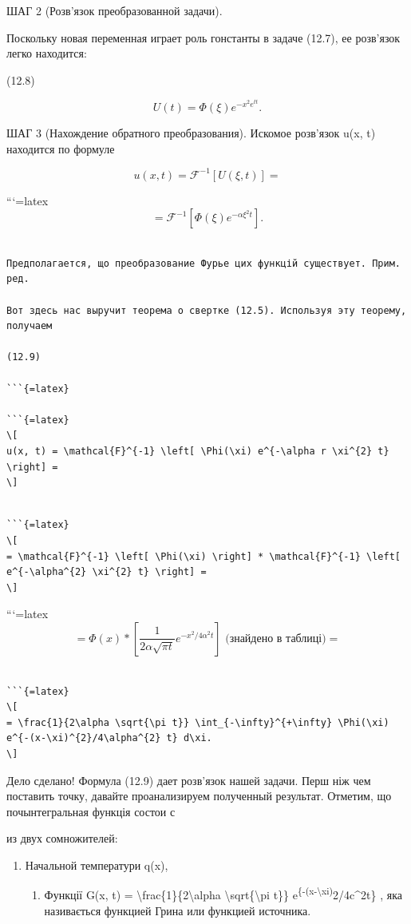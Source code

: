 \documentclass[
]{article}
\providecommand{\tightlist}{%
  \setlength{\itemsep}{0pt}\setlength{\parskip}{0pt}}
\begin{document}
ШАГ 2 (Розв'язок преобразованной задачи).

Поскольку новая переменная играет роль гонстанты в задаче (12.7), ее
розв'язок легко находится:

(12.8)

\[
U(t) = \Phi(\xi) e^{-x^2 e^{tt}}.
\]

ШАГ 3 (Нахождение обратного преобразования). Искомое розв'язок u(x, t)
находится по формуле

\[
u(x, t) = \mathcal{F}^{-1} [U(\xi, t)] =
\]

```{=latex}
\[
= \mathcal{F}^{-1} [\Phi(\xi) e^{-\alpha \xi^2 t}].
\]

\begin{verbatim}

Предполагается, що преобразование Фурье цих функцій существует. Прим. ред.

Вот здесь нас выручит теорема о свертке (12.5). Используя эту теорему, получаем

(12.9)

```{=latex}

```{=latex}
\[
u(x, t) = \mathcal{F}^{-1} \left[ \Phi(\xi) e^{-\alpha r \xi^{2} t} \right] =
\]
\end{verbatim}

\begin{verbatim}

```{=latex}
\[
= \mathcal{F}^{-1} \left[ \Phi(\xi) \right] * \mathcal{F}^{-1} \left[ e^{-\alpha^{2} \xi^{2} t} \right] =
\]
\end{verbatim}

```{=latex}
\[
= \Phi(x) * \left[ \frac{1}{2\alpha \sqrt{\pi t}} e^{-x^{2}/4\alpha^{2} t} \right] \text{ (знайдено в таблиці)} =
\]

\begin{verbatim}

```{=latex}
\[
= \frac{1}{2\alpha \sqrt{\pi t}} \int_{-\infty}^{+\infty} \Phi(\xi) e^{-(x-\xi)^{2}/4\alpha^{2} t} d\xi.
\]
\end{verbatim}

Дело сделано! Формула (12.9) дает розв'язок нашей задачи. Перш ніж чем
поставить точку, давайте проанализируем полученный результат. Отметим,
що почынтегральная функція состои с

из двух сомножителей:

\begin{enumerate}
\def\labelenumi{\arabic{enumi}.}
\item
  Начальной температури q(x),

  \begin{enumerate}
  \def\labelenumii{\arabic{enumii}.}
  \setcounter{enumii}{1}
  \tightlist
  \item
    Функції G(x, t) = \textbackslash frac\{1\}\{2\textbackslash alpha
    \textbackslash sqrt\{\textbackslash pi t\}\}
    e\textsuperscript{\{-(x-\textbackslash xi)}2/4c\^{}2t\} , яка
    називається функцией Грина или функцией источника.
  \end{enumerate}
\end{enumerate}
\end{document}
